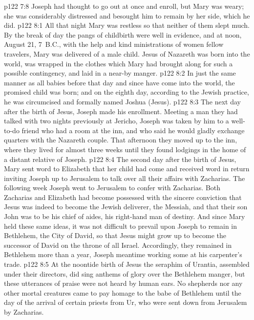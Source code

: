\vs p122 7:8 Joseph had thought to go out at once and enroll, but Mary was weary; she was considerably distressed and besought him to remain by her side, which he did.
\vs p122 8:1 All that night Mary was restless so that neither of them slept much. By the break of day the pangs of childbirth were well in evidence, and at noon, August 21, 7~B.C., with the help and kind ministrations of women fellow travelers, Mary was delivered of a male child. Jesus of Nazareth was born into the world, was wrapped in the clothes which Mary had brought along for such a possible contingency, and laid in a near\hyp{}by manger.
\vs p122 8:2 In just the same manner as all babies before that day and since have come into the world, the promised child was born; and on the eighth day, according to the Jewish practice, he was circumcised and formally named Joshua (Jesus).
\vs p122 8:3 The next day after the birth of Jesus, Joseph made his enrollment. Meeting a man they had talked with two nights previously at Jericho, Joseph was taken by him to a well\hyp{}to\hyp{}do friend who had a room at the inn, and who said he would gladly exchange quarters with the Nazareth couple. That afternoon they moved up to the inn, where they lived for almost three weeks until they found lodgings in the home of a distant relative of Joseph.
\vs p122 8:4 The second day after the birth of Jesus, Mary sent word to Elizabeth that her child had come and received word in return inviting Joseph up to Jerusalem to talk over all their affairs with Zacharias. The following week Joseph went to Jerusalem to confer with Zacharias. Both Zacharias and Elizabeth had become possessed with the sincere conviction that Jesus was indeed to become the Jewish deliverer, the Messiah, and that their son John was to be his chief of aides, his right\hyp{}hand man of destiny. And since Mary held these same ideas, it was not difficult to prevail upon Joseph to remain in Bethlehem, the City of David, so that Jesus might grow up to become the successor of David on the throne of all Israel. Accordingly, they remained in Bethlehem more than a year, Joseph meantime working some at his carpenter’s trade.
\pc \vs p122 8:5 At the noontide birth of Jesus the seraphim of Urantia, assembled under their directors, did sing anthems of glory over the Bethlehem manger, but these utterances of praise were not heard by human ears. No shepherds nor any other mortal creatures came to pay homage to the babe of Bethlehem until the day of the arrival of certain priests from Ur, who were sent down from Jerusalem by Zacharias.
